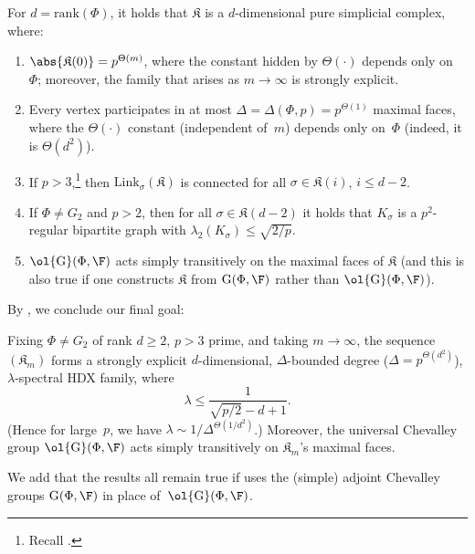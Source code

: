 \documentclass[11pt]{article}
\newcommand{\rnote}[1]{}
\newcommand{\Esc}[2]{\ol{\mathrm{G}}(#1,#2)}
\newcommand{\Gad}[2]{\mathrm{G}(#1,#2)}
\newcommand{\rank}{{\mathrm{rank}}}
\newcommand{\Link}{\mathrm{Link}}
\newcommand{\complex}{\mathfrak{K}}
\begin{document}
\begin{theorem}\label{thm:main}
    For $d = \rank(\Phi)$, it holds that $\complex$ is a $d$-dimensional pure simplicial complex, where:
\begin{enumerate}
\item $\abs{\complex(0)} = p^{\Theta(m)}$, where the constant hidden by $\Theta(\cdot)$ depends only on~$\Phi$; moreover, the family that arises as $m \to \infty$ is strongly explicit.
\rnote{would be good to quantify.  For example, I believe that when you increment $m$ by $+1$, the size of $\complex(0)$ grows by $p^{\poly(d)}$, where the polynomial depends on~$\Phi$.}%
\item Every vertex participates in at most $\Delta = \Delta(\Phi, p) = p^{\Theta(1)}$ maximal faces,  where the $\Theta(\cdot)$ constant (independent of~$m$) depends only on~$\Phi$ (indeed, it is $\Theta(d^2)$).
\item If $p > 3$,\footnote{Recall .} then $\Link_\sigma(\complex)$ is connected for all $\sigma \in \complex(i)$, $i \leq d-2$.
\item If $\Phi \neq G_2$ and $p > 2$, then for all $\sigma \in \complex(d-2)$ it holds that $K_\sigma$ is a $p^2$-regular bipartite graph with $\lambda_2(K_\sigma) \leq \sqrt{2/p}$.
\item $\Esc{\Phi}{\F}$ acts simply transitively on the maximal faces of $\complex$ (and this is also true if one constructs $\complex$ from $\Gad{\Phi}{\F}$ rather than $\Esc{\Phi}{\F}$).
\end{enumerate}
\end{theorem}

By , we conclude our final goal:
\begin{corollary}
    Fixing $\Phi \neq G_2$ of rank $d \geq 2$, $p>3$ prime, and taking $m \to \infty$, the sequence $(\complex_m)$ forms a strongly explicit $d$-dimensional, $\Delta$-bounded degree ($\Delta = p^{\Theta(d^2)}$), $\lambda$-spectral HDX family, where
	\[\lambda \le \frac{1}{\sqrt{p/2} - d + 1}.\]
    (Hence for large~$p$, we have $\lambda \sim 1/\Delta^{\Theta(1/d^2)}$.)
    Moreover, the universal Chevalley group $\Esc{\Phi}{\F}$ acts simply transitively on $\complex_m$'s maximal faces.
\end{corollary}
We add that the results all remain true if uses the (simple) adjoint Chevalley groups $\Gad{\Phi}{\F}$ in place of~$\Esc{\Phi}{\F}$.
\end{document}
